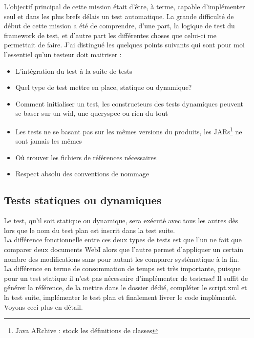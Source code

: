 L'objectif principal de cette mission \'{e}tait d'\^{e}tre, \`{a} terme, capable d'impl\'{e}menter seul et dans les plus brefs d\'{e}lais un test automatique. La grande difficult\'{e} de d\'{e}but de cette mission a \'{e}t\'{e} de comprendre, d'une part, la logique de test du framework de test, et d'autre part les diff\'{e}rentes choses que celui-ci me permettait de faire. J'ai distingu\'{e} les quelques points suivants qui sont pour moi l'essentiel qu'un testeur doit maitriser : 
\begin{itemize}
	\item L'int\'{e}gration du test \`{a} la suite de tests 
  \item Quel type de test mettre en place, statique ou dynamique?
	\item Comment initialiser un test, les constructeurs des tests dynamiques peuvent se baser sur un wid, une queryspec ou rien du tout
	\item Les tests ne se basant pas sur les m\^{e}mes versions du produits, les JARs\footnote{Java ARchive : stock les définitions de classes} ne sont jamais les m\^{e}mes
	\item Où trouver les fichiers de références n\'{e}cessaires
	\item Respect absolu des conventions de nommage
\end{itemize}











\subsection{Tests statiques ou dynamiques}

Le test, qu'il soit statique ou dynamique, sera ex\'{e}cut\'{e} avec tous les autres d\`{e}s lors que le nom du test plan est inscrit dans la test suite.\\
La diff\'{e}rence fonctionnelle entre ces deux types de tests est que l'un ne fait que comparer deux documents WebI alors que l'autre permet d'appliquer un certain nombre des modifications sans pour autant les comparer syst\'{e}matique \`{a} la fin.\\
La diff\'{e}rence en terme de consommation de temps est tr\`{e}s importante, puisque pour un test statique il n'est pas n\'{e}cessaire d'impl\'{e}menter de testcase! Il suffit de g\'{e}n\'{e}rer la r\'{e}f\'{e}rence, de la mettre dans le dossier d\'{e}di\'{e}, compl\'{e}ter le script.xml et la test suite, impl\'{e}menter le test plan et finalement livrer le code impl\'{e}menté. Voyons ceci plus en d\'{e}tail.

